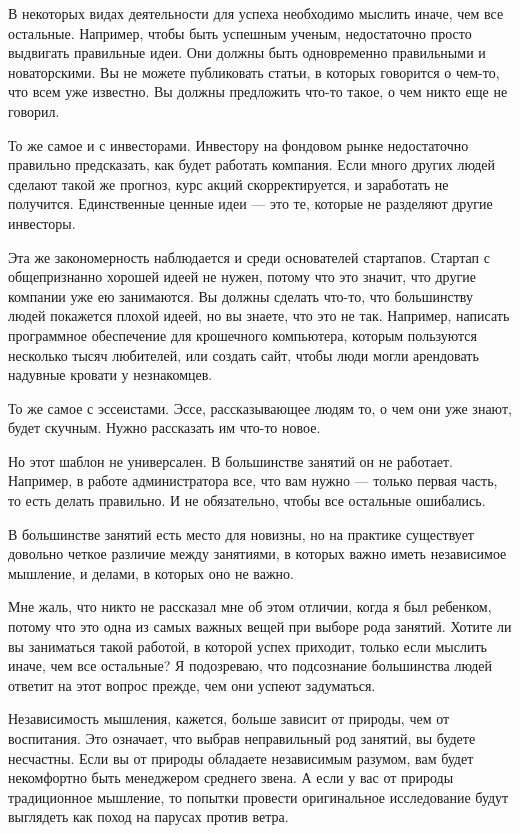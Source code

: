 \documentclass[ebook,12pt,oneside,openany]{memoir}
\begin{document}
\maketitle

В некоторых видах деятельности для успеха необходимо мыслить иначе,
чем все остальные. Например, чтобы быть успешным ученым, недостаточно
просто выдвигать правильные идеи. Они должны быть одновременно
правильными и новаторскими. Вы не можете публиковать статьи, в которых
говорится о чем-то, что всем уже известно. Вы должны предложить что-то
такое, о чем никто еще не говорил.

То же самое и с инвесторами. Инвестору на фондовом рынке недостаточно
правильно предсказать, как будет работать компания. Если много других
людей сделают такой же прогноз, курс акций скорректируется, и
заработать не получится. Единственные ценные идеи — это те, которые не
разделяют другие инвесторы.

Эта же закономерность наблюдается и среди основателей стартапов.
Стартап с общепризнанно хорошей идеей не нужен, потому что это значит,
что другие компании уже ею занимаются. Вы должны сделать что-то, что
большинству людей покажется плохой идеей, но вы знаете, что это не
так. Например, написать программное обеспечение для крошечного
компьютера, которым пользуются несколько тысяч любителей, или создать
сайт, чтобы люди могли арендовать надувные кровати у незнакомцев.

То же самое с эссеистами. Эссе, рассказывающее людям то, о чем они уже
знают, будет скучным. Нужно рассказать им что-то новое.

Но этот шаблон не универсален. В большинстве занятий он не работает.
Например, в работе администратора все, что вам нужно — только первая
часть, то есть делать правильно. И не обязательно, чтобы все остальные
ошибались.

В большинстве занятий есть место для новизны, но на практике
существует довольно четкое различие между занятиями, в которых важно
иметь независимое мышление, и делами, в которых оно не важно.

Мне жаль, что никто не рассказал мне об этом отличии, когда я был
ребенком, потому что это одна из самых важных вещей при выборе рода
занятий. Хотите ли вы заниматься такой работой, в которой успех
приходит, только если мыслить иначе, чем все остальные? Я подозреваю,
что подсознание большинства людей ответит на этот вопрос прежде, чем
они успеют задуматься.

Независимость мышления, кажется, больше зависит от природы, чем от
воспитания. Это означает, что выбрав неправильный род занятий, вы
будете несчастны. Если вы от природы обладаете независимым разумом,
вам будет некомфортно быть менеджером среднего звена. А если у вас от
природы традиционное мышление, то попытки провести оригинальное
исследование будут выглядеть как поход на парусах против ветра.
\end{document}
